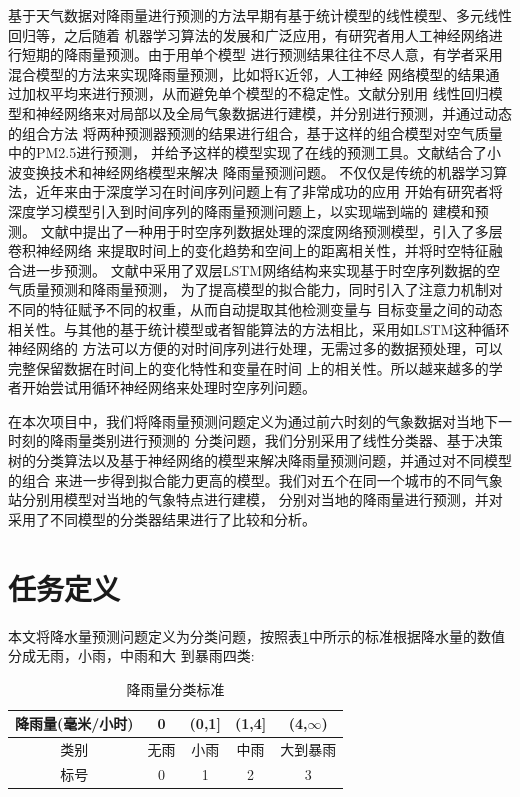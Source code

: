 \documentclass[UTF8]{ctexart}
\begin{document}
基于天气数据对降雨量进行预测的方法早期有基于统计模型的线性模型、多元线性回归等，之后随着
机器学习算法的发展和广泛应用，有研究者用人工神经网络进行短期的降雨量预测。由于用单个模型
进行预测结果往往不尽人意，有学者采用混合模型的方法来实现降雨量预测，比如将K近邻，人工神经
网络模型的结果通过加权平均来进行预测，从而避免单个模型的不稳定性。文献\cite{bit3}分别用
线性回归模型和神经网络来对局部以及全局气象数据进行建模，并分别进行预测，并通过动态的组合方法
将两种预测器预测的结果进行组合，基于这样的组合模型对空气质量中的PM2.5进行预测，
并给予这样的模型实现了在线的预测工具。文献\cite{bit4}结合了小波变换技术和神经网络模型来解决
降雨量预测问题。
不仅仅是传统的机器学习算法，近年来由于深度学习在时间序列问题上有了非常成功的应用
开始有研究者将深度学习模型引入到时间序列的降雨量预测问题上，以实现端到端的
建模和预测。
文献\cite{bit5}中提出了一种用于时空序列数据处理的深度网络预测模型，引入了多层卷积神经网络
来提取时间上的变化趋势和空间上的距离相关性，并将时空特征融合进一步预测。
文献\cite{bit2}中采用了双层LSTM网络结构来实现基于时空序列数据的空气质量预测和降雨量预测，
为了提高模型的拟合能力，同时引入了注意力机制对不同的特征赋予不同的权重，从而自动提取其他检测变量与
目标变量之间的动态相关性。与其他的基于统计模型或者智能算法的方法相比，采用如LSTM这种循环神经网络的
方法可以方便的对时间序列进行处理，无需过多的数据预处理，可以完整保留数据在时间上的变化特性和变量在时间
上的相关性。所以越来越多的学者开始尝试用循环神经网络来处理时空序列问题。

在本次项目中，我们将降雨量预测问题定义为通过前六时刻的气象数据对当地下一时刻的降雨量类别进行预测的
分类问题，我们分别采用了线性分类器、基于决策树的分类算法以及基于神经网络的模型来解决降雨量预测问题，并通过对不同模型的组合
来进一步得到拟合能力更高的模型。我们对五个在同一个城市的不同气象站分别用模型对当地的气象特点进行建模，
分别对当地的降雨量进行预测，并对采用了不同模型的分类器结果进行了比较和分析。

\section{任务定义}
本文将降水量预测问题定义为分类问题，按照表\ref{tab:jyl}中所示的标准根据降水量的数值分成无雨，小雨，中雨和大
到暴雨四类: 

\begin{table}[htb]
  \centering
  \begin{minipage}[t]{\linewidth}
  \centering
  \caption{降雨量分类标准}
  \label{tab:jyl}
    \begin{tabular}{ccccc}
      \toprule[1pt]
      降雨量(毫米/小时) & 0 & (0,1] & (1,4] & (4,$\infty$) \\
      \midrule[0.5pt]
      类别 & 无雨 & 小雨 & 中雨 & 大到暴雨\\
      标号 & 0 & 1 & 2 & 3\\
      \bottomrule[1pt]
    \end{tabular}
  \end{minipage}
\end{table}
\end{document}
